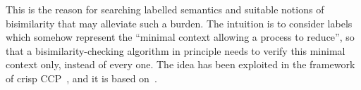 \documentclass[main.tex]{subfiles}
\begin{document}
This is the reason for searching labelled semantics and suitable notions of bisimilarity that may alleviate such a burden. 
%
The intuition is to consider labels which somehow represent  the ``minimal context allowing a process to reduce'', so that a bisimilarity-checking algorithm in principle needs  to verify this minimal context only, instead of every one. 
%
The idea has been exploited in the framework of crisp CCP~\cite{pippo}, and it 
is based on~\cite{Leifer:00:CONCUR,Bonchi:09:FOSSACS}.

%
\end{document}
